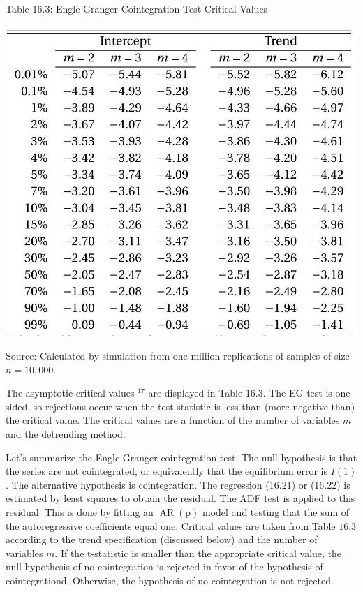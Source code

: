 \documentclass[10pt]{article}
\begin{document}
Table 16.3: Engle-Granger Cointegration Test Critical Values

\includegraphics[max width=\textwidth]{2022_10_23_e99fc7c58db661c6f219g-37}

Source: Calculated by simulation from one million replications of samples of size $n=10,000$.

The asymptotic critical values ${ }^{17}$ are displayed in Table 16.3. The EG test is one-sided, so rejections occur when the test statistic is less than (more negative than) the critical value. The critical values are a function of the number of variables $m$ and the detrending method.

Let's summarize the Engle-Granger cointegration test: The null hypothesis is that the series are not cointegrated, or equivalently that the equilibrium error is $I(1)$. The alternative hypothesis is cointegration. The regression (16.21) or (16.22) is estimated by least squares to obtain the residual. The ADF test is applied to this residual. This is done by fitting an $\operatorname{AR}(\mathrm{p})$ model and testing that the sum of the autoregressive coefficients equal one. Critical values are taken from Table $16.3$ according to the trend specification (discussed below) and the number of variables $m$. If the t-statistic is smaller than the appropriate critical value, the null hypothesis of no cointegration is rejected in favor of the hypothesis of cointegrationd. Otherwise, the hypothesis of no cointegration is not rejected.
\end{document}
